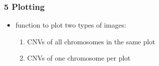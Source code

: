 \documentclass[letterpaper,10pt,english]{sphinxhowto}
\begin{document}
\subsubsection{5 \sphinxhyphen{} Plotting}
\label{\detokenize{index:plotting}}\begin{itemize}
\item {} 
\sphinxAtStartPar
function to plot two types of images:
\begin{enumerate}
%
\item {} 
\sphinxAtStartPar
CNVs of all chromosomes in the same plot

\item {} 
\sphinxAtStartPar
CNVs of one chromosome per plot

\end{enumerate}

\end{itemize}
\end{document}
